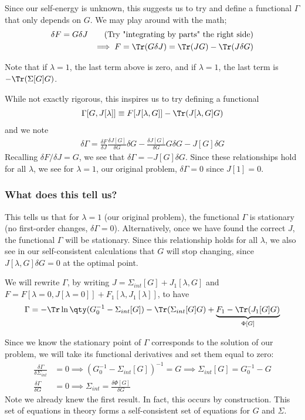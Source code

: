 \documentclass{article}
\begin{document}
Since our self-energy is unknown, this suggests us to try and define a functional $\Gamma$ that only depends on $G$. We may play around with the math;
\begin{align*}
  \delta F = G \delta J \tag{Try "integrating by parts" the right side} \\
  \implies F = \Tr(G \delta J) = \Tr(JG) - \Tr(J \delta G )
\end{align*}
\begin{remark}
  Note that if $\lambda = 1$, the last term above is zero, and if $\lambda=1$, the last term is $-\Tr(\Sigma[G] G)$. 
\end{remark}
While not exactly rigorous, this inspires us to try defining a functional
\begin{align*}
  \Gamma[G, J[\lambda]] \equiv F[J[\lambda, G]] - \Tr(J[\lambda, G]G)
\end{align*}
and we note
\begin{align*}
  \delta \Gamma = \frac{\delta F}{\delta J} \frac{\delta J[G]}{\delta G} \delta G - \frac{\delta J[G]}{\delta G} G \delta G - J[G] \delta G
\end{align*}
Recalling $\delta F/\delta J = G$, we see that $\delta \Gamma = -J[G] \delta G$. Since these relationships hold for all $\lambda$, we see for $\lambda = 1$, our original problem, $\delta \Gamma = 0$ since $J[1] = 0$. 
\subsubsection*{What does this tell us?}

This tells us that for $\lambda = 1$ (our original problem), the functional $\Gamma$ is stationary (no first-order changes, $\delta \Gamma = 0$). Alternatively, once we have found the correct $J$, the functional $\Gamma$ will be stationary. Since this relationship holds for all $\lambda$, we also see in our self-consistent calculations that $G$ will stop changing, since $J[\lambda, G] \delta G = 0$ at the optimal point. 

We will rewrite $\Gamma$, by writing $J = \Sigma_{int}[G] + J_1[\lambda, G]$ and $F = F[\lambda=0, J[\lambda=0]] + F_1[\lambda, J_1[\lambda]]$, to have
\begin{align*}
  \Gamma = -\Tr \ln \qty(G_0^{-1} - \Sigma_{int}[G]) - \Tr(\Sigma_{int}[G] G) + \underbrace{F_1 - \Tr(J_1 [G] G)}_{\Phi[G]}
\end{align*}


Since we know the stationary point of $\Gamma$ corresponds to the solution of our problem, we will take its functional derivatives and set them equal to zero:
\begin{align}\label{eq:self-consistency}
  \frac{\delta \Gamma}{\delta \Sigma_{int}} & = 0 \implies (G_0^{-1} - \Sigma_{int}[G])^{-1} = G \implies \Sigma_{int}[G] = G_0^{-1} - G \\
  \frac{\delta \Gamma}{\delta G} & = 0 \implies \Sigma_{int} = \frac{\delta \Phi[G]}{\delta G}
\end{align}
Note we already knew the first result. In fact, this occurs by construction. This set of equations in theory forms a self-consistent set of equations for $G$ and $\Sigma$. 
\end{document}
